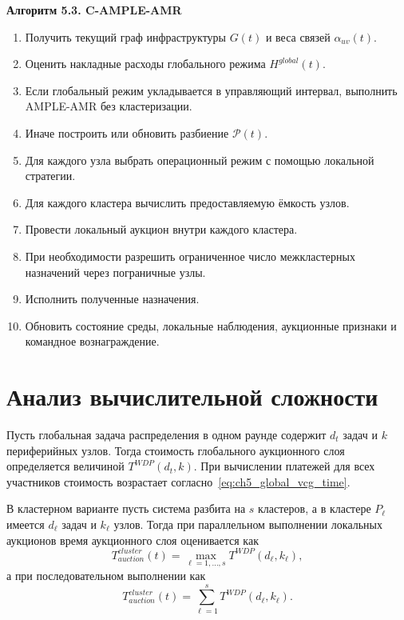 \textbf{Алгоритм 5.3. C-AMPLE-AMR}
\begin{enumerate}
    \item Получить текущий граф инфраструктуры $G(t)$ и веса связей $\alpha_{uv}(t)$.
    \item Оценить накладные расходы глобального режима $H^{global}(t)$.
    \item Если глобальный режим укладывается в управляющий интервал, выполнить AMPLE-AMR без кластеризации.
    \item Иначе построить или обновить разбиение $\mathcal{P}(t)$.
    \item Для каждого узла выбрать операционный режим с помощью локальной стратегии.
    \item Для каждого кластера вычислить предоставляемую ёмкость узлов.
    \item Провести локальный аукцион внутри каждого кластера.
    \item При необходимости разрешить ограниченное число межкластерных назначений через пограничные узлы.
    \item Исполнить полученные назначения.
    \item Обновить состояние среды, локальные наблюдения, аукционные признаки и командное вознаграждение.
\end{enumerate}

\section{Анализ вычислительной сложности}

Пусть глобальная задача распределения в одном раунде содержит $d_t$ задач и $k$ периферийных узлов. Тогда стоимость глобального аукционного слоя определяется величиной $T^{WDP}(d_t,k)$. При вычислении платежей для всех участников стоимость возрастает согласно~\eqref{eq:ch5_global_vcg_time}.

В кластерном варианте пусть система разбита на $s$ кластеров, а в кластере $P_\ell$ имеется $d_\ell$ задач и $k_\ell$ узлов. Тогда при параллельном выполнении локальных аукционов время аукционного слоя оценивается как
\begin{equation}
    T^{cluster}_{auction}(t)=\max_{\ell=1,\ldots,s}T^{WDP}(d_\ell,k_\ell),
    \label{eq:ch5_cluster_parallel_time}
\end{equation}
а при последовательном выполнении как
\begin{equation}
    T^{cluster}_{auction}(t)=\sum_{\ell=1}^{s}T^{WDP}(d_\ell,k_\ell).
    \label{eq:ch5_cluster_sequential_time}
\end{equation}

